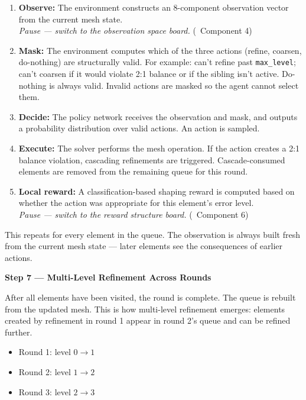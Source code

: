 \documentclass[11pt]{article}
\begin{document}
\begin{enumerate}[leftmargin=1.5em, itemsep=2pt]
    \item \textbf{Observe:} The environment constructs an 8-component observation vector from the current mesh state. \\
    \textit{Pause --- switch to the observation space board.} (\textrightarrow~Component 4)
    \item \textbf{Mask:} The environment computes which of the three actions (refine, coarsen, do-nothing) are structurally valid. For example: can't refine past \texttt{max\_level}; can't coarsen if it would violate 2:1 balance or if the sibling isn't active. Do-nothing is always valid. Invalid actions are masked so the agent cannot select them.
    \item \textbf{Decide:} The policy network receives the observation and mask, and outputs a probability distribution over valid actions. An action is sampled.
    \item \textbf{Execute:} The solver performs the mesh operation. If the action creates a 2:1 balance violation, cascading refinements are triggered. Cascade-consumed elements are removed from the remaining queue for this round.
    \item \textbf{Local reward:} A classification-based shaping reward is computed based on whether the action was appropriate for this element's error level. \\
    \textit{Pause --- switch to the reward structure board.} (\textrightarrow~Component 6)
\end{enumerate}

This repeats for every element in the queue. The observation is always built fresh from the current mesh state --- later elements see the consequences of earlier actions.

\vspace{0.3cm}

\noindent\textbf{\textcolor{roundcolor}{Step 7 --- Multi-Level Refinement Across Rounds}}

After all elements have been visited, the round is complete. The queue is rebuilt from the updated mesh. This is how multi-level refinement emerges: elements created by refinement in round 1 appear in round 2's queue and can be refined further.

\begin{itemize}[leftmargin=1.5em, itemsep=1pt]
    \item Round 1: level $0 \to 1$
    \item Round 2: level $1 \to 2$
    \item Round 3: level $2 \to 3$
\end{itemize}
\end{document}
